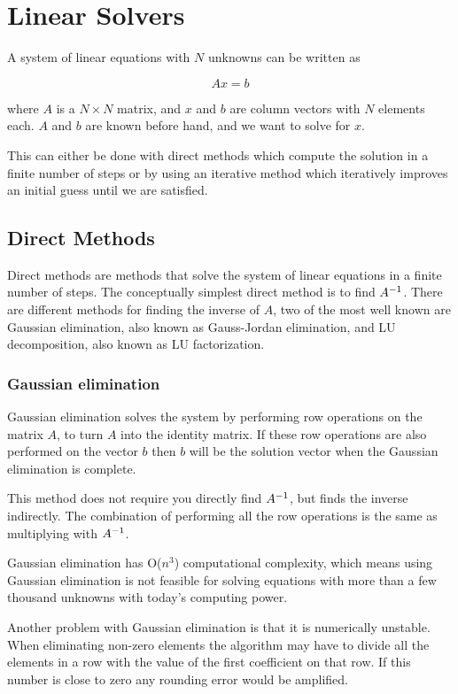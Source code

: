 \section*{Linear Solvers}

A system of linear equations with $N$ unknowns can be written as 

$$Ax = b$$

where $A$ is a $N \times N$ matrix, and $x$ and $b$ are column vectors with $N$ 
elements each. $A$ and $b$ are known before hand, and we want to solve for $x$.

This can either be done with direct methods which compute the solution in a finite 
number of steps or by using an iterative method which iteratively improves an initial 
guess until we are satisfied. 

\subsection*{Direct Methods}

Direct methods are methods that solve the system of linear equations in a finite
number of steps. The conceptually simplest direct method is to find ${A}^{-1}$. 
There are different methods for finding the inverse of $A$, two of the most 
well known are Gaussian elimination, also known as Gauss-Jordan elimination, 
and LU decomposition, also known as LU factorization.

\subsubsection*{Gaussian elimination}

Gaussian elimination solves the system by performing row operations on the matrix 
$A$, to turn $A$ into the identity matrix. If these row operations are also performed 
on the vector $b$ then $b$ will be the solution vector when the Gaussian elimination 
is complete.

This method does not require you directly find ${A}^{-1}$, but finds the inverse 
indirectly. The combination of performing all the row operations is the same as 
multiplying with ${A}^{-1}$.

Gaussian elimination has O($n^3$) computational complexity, which means using 
Gaussian elimination is not feasible for solving equations with more than a few 
thousand unknowns with today's computing power.

Another problem with Gaussian elimination is that it is numerically unstable. 
When eliminating non-zero elements the algorithm may have to divide all the elements 
in a row with the value of the first coefficient on that row. If this number is 
close to zero any rounding error would be amplified.

